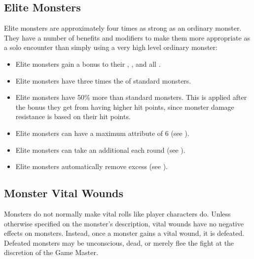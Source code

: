    \subsection{Elite Monsters}\label{Elite Monsters}
        Elite monsters are approximately four times as strong as an ordinary monster.
        They have a number of benefits and modifiers to make them more appropriate as a solo encounter than simply using a very high level ordinary monster:
        \begin{itemize}
            \item Elite monsters gain a  bonus to their , , and all .
            \item Elite monsters have three times the  of standard monsters.
            \item Elite monsters have 50\% more  than standard monsters. This is applied after the bonus they get from having higher hit points, since monster damage resistance is based on their hit points.
            \item Elite monsters can have a maximum attribute of 6 (see ).
            \item Elite monsters can take an additional  each round (see ).
            \item Elite monsters automatically remove excess  (see ).
        \end{itemize}

        \subsection{Monster Vital Wounds}
            Monsters do not normally make vital rolls like player characters do.
            Unless otherwise specified on the monster's description, vital wounds have no negative effects on monsters.
            Instead, once a monster gains a vital wound, it is defeated.
            Defeated monsters may be unconscious, dead, or merely flee the fight at the discretion of the Game Master.

